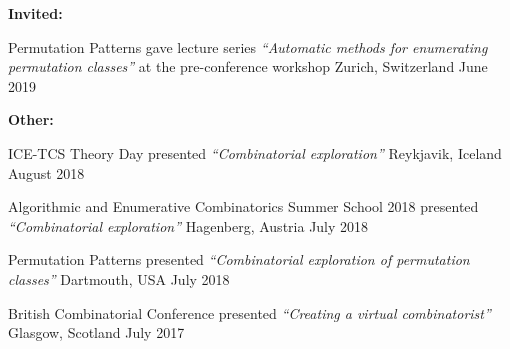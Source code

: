 


\begin{cvhonors}
\begin{flushleft}
  \textbf{Invited:}
\end{flushleft}

\cvhonor
  {Permutation Patterns} %
  {gave lecture series \textit{``Automatic methods for enumerating permutation classes''} at the pre-conference workshop} %
  {Zurich, Switzerland} %
  {June 2019} %


\begin{flushleft}
  \textbf{Other:}
\end{flushleft}

\cvhonor
  {ICE-TCS Theory Day} %
  {presented \textit{``Combinatorial exploration''}} %
  {Reykjavik, Iceland} %
  {August 2018} %



\cvhonor
  {Algorithmic and Enumerative Combinatorics Summer School 2018} %
  {presented \textit{``Combinatorial exploration''}} %
  {Hagenberg, Austria} %
  {July 2018} %


\cvhonor
  {Permutation Patterns} %
  {presented \textit{``Combinatorial exploration of permutation classes''}} %
  {Dartmouth, USA} %
  {July 2018} %



\cvhonor
  {British Combinatorial Conference} %
  {presented \textit{``Creating a virtual combinatorist''}} %
  {Glasgow, Scotland} %
  {July 2017} %



\end{cvhonors}
